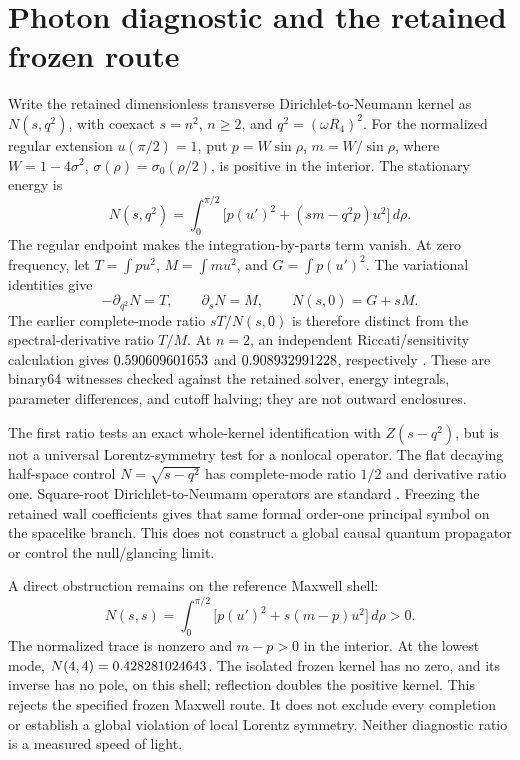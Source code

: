 \documentclass[11pt]{article}
\begin{document}
\section{Photon diagnostic and the retained frozen route}
Write the retained dimensionless transverse Dirichlet-to-Neumann kernel as
\(N(s,q^2)\), with coexact \(s=n^2\), \(n\geq2\), and
\(q^2=(\omega R_4)^2\). For the normalized regular extension
\(u(\pi/2)=1\), put \(p=W\sin\rho\), \(m=W/\sin\rho\), where
\(W=1-4\sigma^2\), \(\sigma(\rho)=\sigma_0(\rho/2)\), is positive
in the interior. The stationary energy is
\begin{equation}
 N(s,q^2)=\int_0^{\pi/2}\bigl[p(u')^2+(s m-q^2p)u^2\bigr]\,d\rho.
\end{equation}
The regular endpoint makes the integration-by-parts term vanish.
At zero frequency, let \(T=\int p u^2\), \(M=\int m u^2\), and
\(G=\int p(u')^2\). The variational identities give
\begin{equation}
 -\partial_{q^2}N=T,\qquad \partial_sN=M,\qquad N(s,0)=G+sM.
\end{equation}
The earlier complete-mode ratio \(sT/N(s,0)\) is therefore distinct from
the spectral-derivative ratio \(T/M\). At \(n=2\), an independent
Riccati/sensitivity calculation gives \(0.590609601653\) and
\(0.908932991228\), respectively \cite{photon}. These are binary64
witnesses checked against the retained solver, energy integrals, parameter
differences, and cutoff halving; they are not outward enclosures.

The first ratio tests an exact whole-kernel identification with
\(Z(s-q^2)\), but is not a universal Lorentz-symmetry test for a nonlocal
operator. The flat decaying half-space control \(N=\sqrt{s-q^2}\) has
complete-mode ratio \(1/2\) and derivative ratio one. Square-root
Dirichlet-to-Neumann operators are standard \cite{extension}. Freezing the
retained wall coefficients gives that same formal order-one principal
symbol on the spacelike branch. This does not construct a global causal
quantum propagator or control the null/glancing limit.

A direct obstruction remains on the reference Maxwell shell:
\begin{equation}
 N(s,s)=\int_0^{\pi/2}\bigl[p(u')^2+s(m-p)u^2\bigr]\,d\rho>0.
\end{equation}
The normalized trace is nonzero and \(m-p>0\) in the interior. At the
lowest mode, \(N(4,4)=0.428281024643\). The isolated frozen kernel
has no zero, and its inverse has no pole, on this shell; reflection doubles
the positive kernel. This rejects the specified frozen Maxwell route. It
does not exclude every completion or establish a global violation of local
Lorentz symmetry. Neither diagnostic ratio is a measured speed of light.
\end{document}
